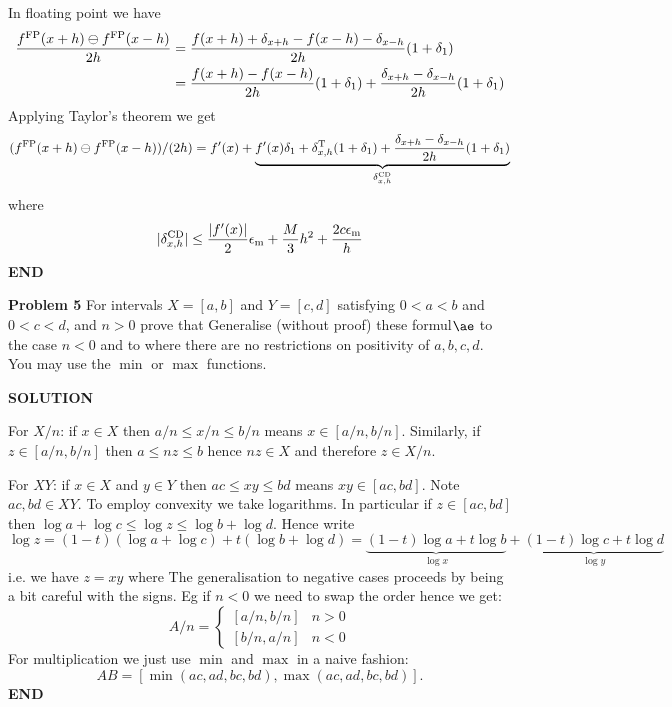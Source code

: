 \documentclass[12pt,a4paper]{article}
\begin{document}
In floating point we have
\begin{align*}
{f^{\rm FP}(x + h) \ensuremath{\ominus} f^{\rm FP}(x-h) \over 2h} &= {f(x + h) +  \ensuremath{\delta}_{x+h} - f(x-h) - \ensuremath{\delta}_{x-h} \over 2h} (1 + \ensuremath{\delta}_1) \\
&= {f(x+h) - f(x-h) \over 2h} (1 + \ensuremath{\delta}_1) + {\ensuremath{\delta}_{x+h}- \ensuremath{\delta}_{x-h} \over 2h} (1 + \ensuremath{\delta}_1)
\end{align*}
Applying Taylor's theorem we get
\[
(f^{\rm FP}(x + h) \ensuremath{\ominus} f^{\rm FP}(x-h)) / (2h) =
f'(x) + \underbrace{f'(x) \ensuremath{\delta}_1 + \ensuremath{\delta}_{x,h}^{\rm T} (1 + \ensuremath{\delta}_1) + {\ensuremath{\delta}_{x+h}- \ensuremath{\delta}_{x-h} \over 2h} (1 + \ensuremath{\delta}_1)}_{\ensuremath{\delta}_{x,h}^{\rm CD}}
\]
where
\[
|\ensuremath{\delta}_{x,h}^{\rm CD}| \ensuremath{\leq} {|f'(x)| \over 2} \ensuremath{\epsilon}_{\rm m} + {M \over 3} h^2 + {2 c \ensuremath{\epsilon}_{\rm m} \over h}
\]
\textbf{END}

\textbf{Problem 5} For intervals  $X = [a,b]$ and $Y = [c,d]$ satisfying $0 < a < b$ and $0 < c < d$, and $n > 0$ prove that
Generalise (without proof) these formul\ensuremath{\ae} to the case $n < 0$ and to where there are no restrictions on positivity of $a,b,c,d$. You may use the $\min$ or $\max$ functions.

\textbf{SOLUTION}

For $X/n$: if $x \ensuremath{\in} X$ then $a/n \ensuremath{\leq} x/n \ensuremath{\leq} b/n$ means $x \ensuremath{\in} [a/n,b/n]$. Similarly,  if $z \ensuremath{\in} [a/n,b/n]$ then $a \ensuremath{\leq} nz \ensuremath{\leq} b$ hence $nz \ensuremath{\in} X$ and therefore $z \ensuremath{\in} X/n$.

For $XY$: if $x \ensuremath{\in} X$ and $y \ensuremath{\in} Y$ then $ac \ensuremath{\leq} xy \ensuremath{\leq} bd$ means $xy \ensuremath{\in} [ac,bd]$. Note $ac,bd \ensuremath{\in} XY$. To employ convexity we take logarithms. In particular if $z \ensuremath{\in} [ac,bd]$ then $\log a + \log c \ensuremath{\leq} \log z \ensuremath{\leq} \log b + \log d$. Hence write
\[
\log z = (1-t) (\log a + \log c) + t (\log b + \log d) =
        \underbrace{(1-t)\log a + t \log b}_{\log x} + \underbrace{(1-t)\log c + t \log d}_{\log y}
\]
i.e. we have $z = xy$ where
The generalisation to negative cases proceeds by being a bit careful with the signs. Eg if $n < 0$ we need to swap the order hence we get:
\[
A/n =  \begin{cases}
[a/n,b/n] & n > 0  \\
[b/n,a/n] & n < 0 
\end{cases}
\]
For multiplication we just use $\min$ and $\max$ in a naive fashion:
\[
AB = [\min(ac,ad,bc,bd), \max(ac,ad,bc,bd)].
\]
\textbf{END}
\end{document}
